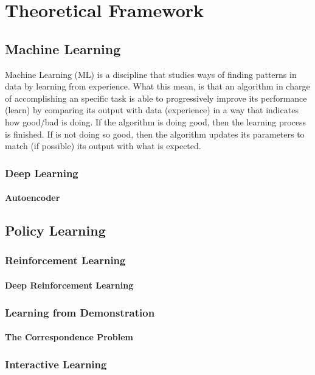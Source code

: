 \chapter{Theoretical Framework}
\section{Machine Learning}

Machine Learning (ML) is a discipline that studies ways of finding patterns in data by learning from experience. What this mean, is that an algorithm in charge of accomplishing an specific task is able to progressively improve its performance (learn) by comparing its output with data (experience) in a way that indicates how good/bad is doing. If the algorithm is doing good, then the learning process is finished. If is not doing so good, then the algorithm updates its parameters to match (if possible) its output with what is expected.   
\subsection{Deep Learning}

\subsubsection{Autoencoder}

\section{Policy Learning}
\subsection{Reinforcement Learning}
\subsubsection{Deep Reinforcement Learning}
\subsection{Learning from Demonstration}
\subsubsection{The Correspondence Problem}
\subsection{Interactive Learning}
